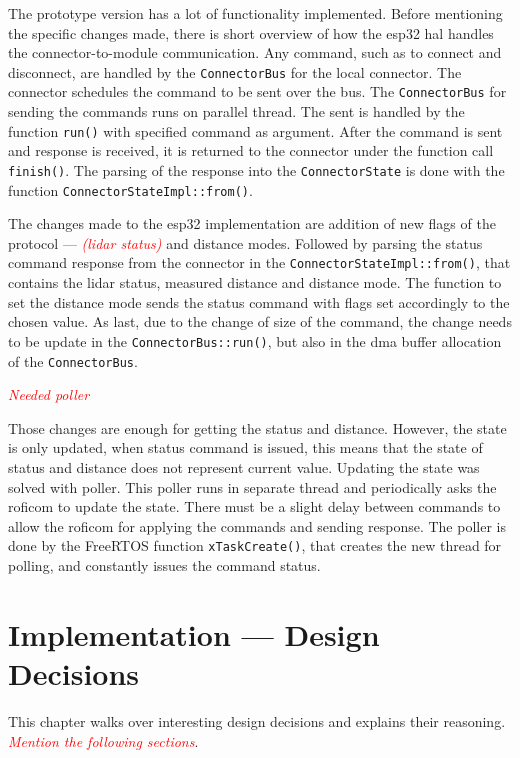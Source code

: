 \documentclass[
  digital,     %
  oneside,     %
  nosansbold,  %
  nocolorbold, %
  lof,         %
  lot,         %
]{fithesis4}
\newcommand{\TODO}[1]{\textcolor{red}{\textit{#1}}}
\begin{document}
{{{The prototype version has a lot of functionality implemented. Before mentioning the specific changes made, there is short overview of how the esp32 \acrshort{hal} handles the connector-to-module communication. Any command, such as to connect and disconnect, are handled by the \lstinline|ConnectorBus| for the local connector. The connector schedules the command to be sent over the bus. The \lstinline|ConnectorBus| for sending the commands runs on parallel thread. The sent is handled by the function \lstinline|run()| with specified command as argument. After the command is sent and response is received, it is returned to the connector under the function call \lstinline|finish()|. The parsing of the response into the \lstinline|ConnectorState| is done with the function \lstinline|ConnectorStateImpl::from()|.

The changes made to the esp32 implementation are addition of new flags of the protocol --- \TODO{(\acrshort{lidar} status)} and distance modes. Followed by parsing the status command response from the connector in the \lstinline|ConnectorStateImpl::from()|, that contains the \acrshort{lidar} status, measured distance and distance mode. The function to set the distance mode sends the status command with flags set accordingly to the chosen value. As last, due to the change of size of the command, the change needs to be update in the \lstinline|ConnectorBus::run()|, but also in the dma buffer allocation of the \lstinline|ConnectorBus|.

\TODO{Needed poller}

Those changes are enough for getting the status and distance. However, the state is only updated, when status command is issued, this means that the state of status and distance does not represent current value. Updating the state was solved with poller. This poller runs in separate thread and periodically asks the \acrshort{roficom} to update the state. There must be a slight delay between commands to allow the \acrshort{roficom} for applying the commands and sending response. The poller is done by the FreeRTOS function \lstinline|xTaskCreate()|, that creates the new thread for polling, and constantly issues the command status.

\chapter{ Implementation --- Design Decisions }
This chapter walks over interesting design decisions and explains their reasoning. \TODO{Mention the following sections}.


}}}
\end{document}
